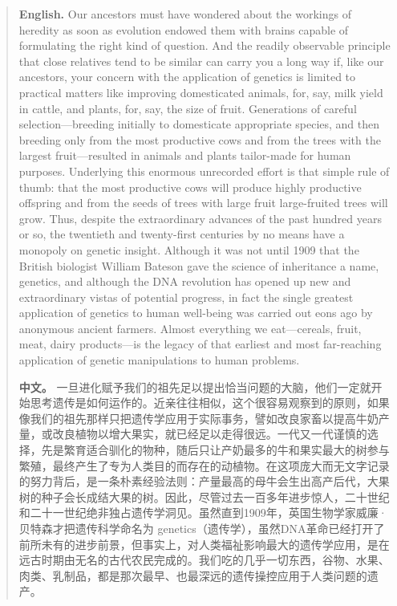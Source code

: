 \begin{quote}
\noindent\textbf{English.} Our ancestors must have wondered about the workings of heredity as soon as evolution endowed them with brains capable of formulating the right kind of question. And the readily observable principle that close relatives tend to be similar can carry you a long way if, like our ancestors, your concern with the application of genetics is limited to practical matters like improving domesticated animals, for, say, milk yield in cattle, and plants, for, say, the size of fruit. Generations of careful selection---breeding initially to domesticate appropriate species, and then breeding only from the most productive cows and from the trees with the largest fruit---resulted in animals and plants tailor-made for human purposes. Underlying this enormous unrecorded effort is that simple rule of thumb: that the most productive cows will produce highly productive offspring and from the seeds of trees with large fruit large-fruited trees will grow. Thus, despite the extraordinary advances of the past hundred years or so, the twentieth and twenty-first centuries by no means have a monopoly on genetic insight. Although it was not until 1909 that the British biologist William Bateson gave the science of inheritance a name, genetics, and although the DNA revolution has opened up new and extraordinary vistas of potential progress, in fact the single greatest application of genetics to human well-being was carried out eons ago by anonymous ancient farmers. Almost everything we eat---cereals, fruit, meat, dairy products---is the legacy of that earliest and most far-reaching application of genetic manipulations to human problems.

\smallskip
\noindent\textbf{中文。} 一旦进化赋予我们的祖先足以提出恰当问题的大脑，他们一定就开始思考遗传是如何运作的。近亲往往相似，这个很容易观察到的原则，如果像我们的祖先那样只把遗传学应用于实际事务，譬如改良家畜以提高牛奶产量，或改良植物以增大果实，就已经足以走得很远。一代又一代谨慎的选择，先是繁育适合驯化的物种，随后只让产奶最多的牛和果实最大的树参与繁殖，最终产生了专为人类目的而存在的动植物。在这项庞大而无文字记录的努力背后，是一条朴素经验法则：产量最高的母牛会生出高产后代，大果树的种子会长成结大果的树。因此，尽管过去一百多年进步惊人，二十世纪和二十一世纪绝非独占遗传学洞见。虽然直到1909年，英国生物学家威廉·贝特森才把遗传科学命名为 genetics（遗传学），虽然DNA革命已经打开了前所未有的进步前景，但事实上，对人类福祉影响最大的遗传学应用，是在远古时期由无名的古代农民完成的。我们吃的几乎一切东西，谷物、水果、肉类、乳制品，都是那次最早、也最深远的遗传操控应用于人类问题的遗产。
\end{quote}

